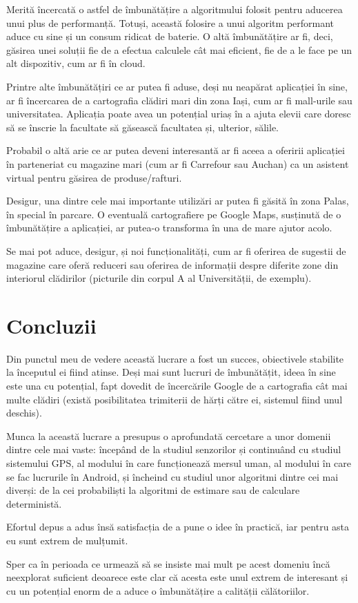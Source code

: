 \documentclass[12pt, a4paper, oneside]{article}
\begin{document}
Merită încercată o astfel de îmbunătățire a algoritmului folosit pentru aducerea unui plus de performanță. Totuși, această folosire a unui algoritm performant aduce cu sine și un consum ridicat de baterie. O altă îmbunătățire ar fi, deci, găsirea unei soluții fie de a efectua calculele cât mai eficient, fie de a le face pe un alt dispozitiv, cum ar fi în cloud.

Printre alte îmbunătățiri ce ar putea fi aduse, deși nu neapărat aplicației în sine, ar fi încercarea de a cartografia clădiri mari din zona Iași, cum ar fi mall-urile sau universitatea. Aplicația poate avea un potențial uriaș în a ajuta elevii care doresc să se înscrie la facultate să găsească facultatea și, ulterior, sălile.

Probabil o altă arie ce ar putea deveni interesantă ar fi aceea a oferirii aplicației în parteneriat cu magazine mari (cum ar fi Carrefour sau Auchan) ca un asistent virtual pentru găsirea de produse/rafturi.

Desigur, una dintre cele mai importante utilizări ar putea fi găsită în zona Palas, în special în parcare. O eventuală cartografiere pe Google Maps, susținută de o îmbunătățire a aplicației, ar putea-o transforma în una de mare ajutor acolo.

Se mai pot aduce, desigur, și noi funcționalități, cum ar fi oferirea de sugestii de magazine care oferă reduceri sau oferirea de informații despre diferite zone din interiorul clădirilor (picturile din corpul A al Universității, de exemplu).

\newpage
\section{Concluzii} \label{Concluzii}
Din punctul meu de vedere această lucrare a fost un succes, obiectivele stabilite la începutul ei fiind atinse. Deși mai sunt lucruri de îmbunătățit, ideea în sine este una cu potențial, fapt dovedit de încercările Google de a cartografia cât mai multe clădiri (există posibilitatea trimiterii de hărți către ei, sistemul fiind unul deschis).

Munca la această lucrare a presupus o aprofundată cercetare a unor domenii dintre cele mai vaste: începând de la studiul senzorilor și continuând cu studiul sistemului GPS, al modului în care funcționează mersul uman, al modului în care se fac lucrurile în Android, și încheind cu studiul unor algoritmi dintre cei mai diverși: de la cei probabiliști la algoritmi de estimare sau de calculare deterministă.

Efortul depus a adus însă satisfacția de a pune o idee în practică, iar pentru asta eu sunt extrem de mulțumit.

Sper ca în perioada ce urmează să se insiste mai mult pe acest domeniu încă neexplorat suficient deoarece este clar că acesta este unul extrem de interesant și cu un potențial enorm de a aduce o îmbunătățire a calității călătoriilor.

\newpage
{}


\nocite{*}
\end{document}
